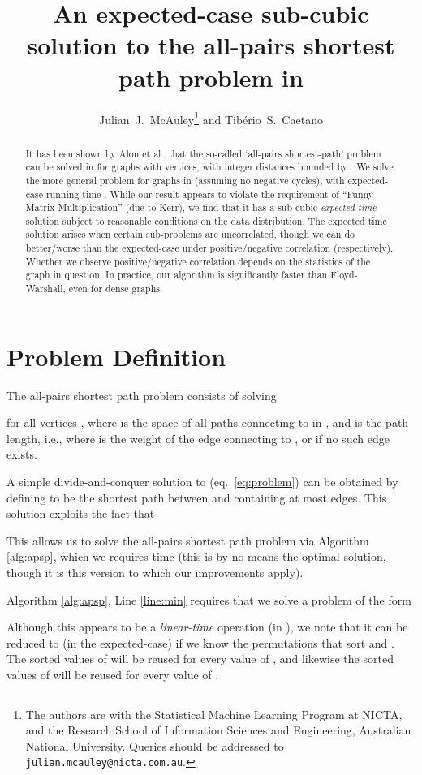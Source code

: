 \documentclass[a4paper,10pt]{article}
\title{An expected-case sub-cubic solution to the all-pairs shortest path problem in }
\author{Julian~J.~McAuley\thanks{The authors are with the Statistical Machine Learning Program at NICTA, and the Research School of Information Sciences and Engineering, Australian National University. Queries should be addressed to \texttt{julian.mcauley@nicta.com.au}.} and Tib\'erio~S.~Caetano}
\newcommand{\eq}[1]{(eq.~\ref{#1})}
\begin{document}
\maketitle

\begin{abstract}
It has been shown by Alon et al.~that the so-called `all-pairs shortest-path' problem can be solved in  for graphs with  vertices, with integer distances bounded by . We solve the more general problem for graphs in  (assuming no negative cycles), with expected-case running time . While our result appears to violate the  requirement of ``Funny Matrix Multiplication'' (due to Kerr), we find that it has a sub-cubic \emph{expected time} solution subject to reasonable conditions on the data distribution. The expected time solution arises when certain sub-problems are uncorrelated, though we can do better/worse than the expected-case under positive/negative correlation (respectively). Whether we observe positive/negative correlation depends on the statistics of the graph in question.
In practice, our algorithm is significantly faster than Floyd-Warshall, even for dense graphs.
\end{abstract}

\section{Problem Definition}

The all-pairs shortest path problem \cite{Dijkstra59} consists of solving

for all vertices , where  is the space of all paths connecting  to  in , and  is the path length, i.e.,  where  is the weight of the edge connecting  to , or  if no such edge exists.

A simple divide-and-conquer solution to \eq{eq:problem} can be obtained by defining  to be the shortest path between  and  containing at most  edges. This solution exploits the fact that

This allows us to solve the all-pairs shortest path problem via Algorithm \ref{alg:apsp}, which we requires  time (this is by no means the optimal solution, though it is this version to which our improvements apply).

Algorithm \ref{alg:apsp}, Line \ref{line:min} requires that we solve a problem of the form

Although this appears to be a \emph{linear-time} operation (in ), we note that it can be reduced to  (in the expected-case) if we know the permutations that sort  and . The sorted values of  will be reused for every value of , and likewise the sorted values of  will be reused for every value of .
\end{document}
